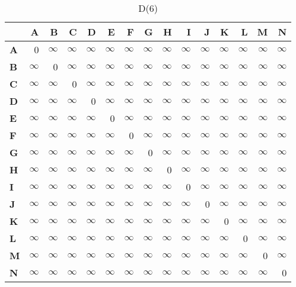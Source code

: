 \documentclass{article}
\newcommand{\INF}{$\infty$}
\begin{document}
\begin{table}[H]\centering
\caption{D(6)}
\begin{tabular}{l r r r r r r r r r r r r r r}
\toprule
 & \textbf{A} & \textbf{B} & \textbf{C} & \textbf{D} & \textbf{E} & \textbf{F} & \textbf{G} & \textbf{H} & \textbf{I} & \textbf{J} & \textbf{K} & \textbf{L} & \textbf{M} & \textbf{N}\\\midrule
\textbf{A} & 0 & \INF & \INF & \INF & \INF & \INF & \INF & \INF & \INF & \INF & \INF & \INF & \INF & \INF \\
\textbf{B} & \INF & 0 & \INF & \INF & \INF & \INF & \INF & \INF & \INF & \INF & \INF & \INF & \INF & \INF \\
\textbf{C} & \INF & \INF & 0 & \INF & \INF & \INF & \INF & \INF & \INF & \INF & \INF & \INF & \INF & \INF \\
\textbf{D} & \INF & \INF & \INF & 0 & \INF & \INF & \INF & \INF & \INF & \INF & \INF & \INF & \INF & \INF \\
\textbf{E} & \INF & \INF & \INF & \INF & 0 & \INF & \INF & \INF & \INF & \INF & \INF & \INF & \INF & \INF \\
\textbf{F} & \INF & \INF & \INF & \INF & \INF & 0 & \INF & \INF & \INF & \INF & \INF & \INF & \INF & \INF \\
\textbf{G} & \INF & \INF & \INF & \INF & \INF & \INF & 0 & \INF & \INF & \INF & \INF & \INF & \INF & \INF \\
\textbf{H} & \INF & \INF & \INF & \INF & \INF & \INF & \INF & 0 & \INF & \INF & \INF & \INF & \INF & \INF \\
\textbf{I} & \INF & \INF & \INF & \INF & \INF & \INF & \INF & \INF & 0 & \INF & \INF & \INF & \INF & \INF \\
\textbf{J} & \INF & \INF & \INF & \INF & \INF & \INF & \INF & \INF & \INF & 0 & \INF & \INF & \INF & \INF \\
\textbf{K} & \INF & \INF & \INF & \INF & \INF & \INF & \INF & \INF & \INF & \INF & 0 & \INF & \INF & \INF \\
\textbf{L} & \INF & \INF & \INF & \INF & \INF & \INF & \INF & \INF & \INF & \INF & \INF & 0 & \INF & \INF \\
\textbf{M} & \INF & \INF & \INF & \INF & \INF & \INF & \INF & \INF & \INF & \INF & \INF & \INF & 0 & \INF \\
\textbf{N} & \INF & \INF & \INF & \INF & \INF & \INF & \INF & \INF & \INF & \INF & \INF & \INF & \INF & 0 \\
\bottomrule
\end{tabular}
\end{table}
\end{document}
